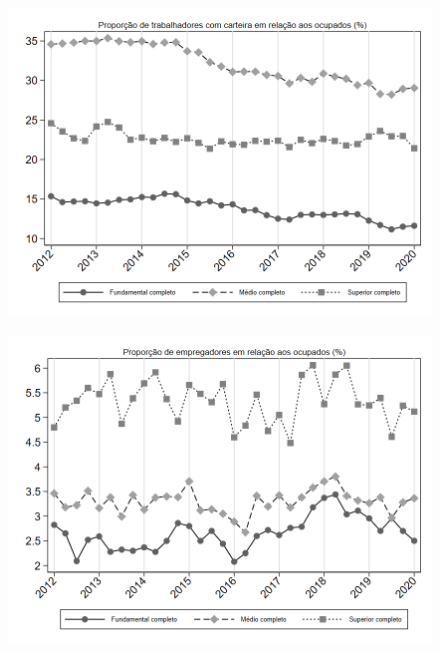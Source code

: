 \begin{frame}[label=_composicao_demografica_educacao_prop_empregadoCC]{}
\textit{\hyperlink{_composicao_demografica_educacao}{}}
\begin{figure}
  \centering
  \includegraphics[width=1.0\linewidth]{../../analysis/output/composicao_demografica/educacao/_composicao_demografica_educacao_prop_empregadoCC.png}
  \caption{}
  \label{fig:_composicao_demografica_educacao_prop_empregadoCC}
\end{figure}
\end{frame}

\begin{frame}[label=_composicao_demografica_educacao_prop_empregador]{}
\textit{\hyperlink{_composicao_demografica_educacao}{}}
\begin{figure}
  \centering
  \includegraphics[width=1.0\linewidth]{../../analysis/output/composicao_demografica/educacao/_composicao_demografica_educacao_prop_empregador.png}
  \caption{}
  \label{fig:_composicao_demografica_educacao_prop_empregador}
\end{figure}
\end{frame}



